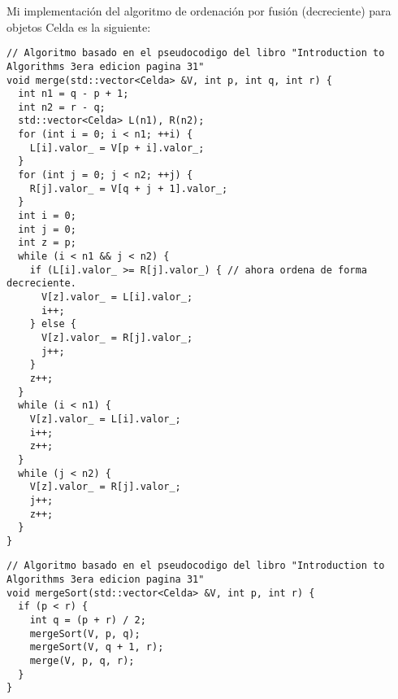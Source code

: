Mi implementación del algoritmo de ordenación por fusión (decreciente) para objetos Celda es la siguiente:
\begin{lstlisting}
// Algoritmo basado en el pseudocodigo del libro "Introduction to Algorithms 3era edicion pagina 31"
void merge(std::vector<Celda> &V, int p, int q, int r) {
  int n1 = q - p + 1;
  int n2 = r - q;
  std::vector<Celda> L(n1), R(n2);
  for (int i = 0; i < n1; ++i) {
    L[i].valor_ = V[p + i].valor_;
  }
  for (int j = 0; j < n2; ++j) {
    R[j].valor_ = V[q + j + 1].valor_;
  }
  int i = 0;
  int j = 0;
  int z = p;
  while (i < n1 && j < n2) {
    if (L[i].valor_ >= R[j].valor_) { // ahora ordena de forma decreciente.
      V[z].valor_ = L[i].valor_;
      i++;
    } else {
      V[z].valor_ = R[j].valor_;
      j++;
    }
    z++;
  }
  while (i < n1) {
    V[z].valor_ = L[i].valor_;
    i++;
    z++;
  }
  while (j < n2) {
    V[z].valor_ = R[j].valor_;
    j++;
    z++;
  }
}
\end{lstlisting}

\begin{lstlisting}
// Algoritmo basado en el pseudocodigo del libro "Introduction to Algorithms 3era edicion pagina 31"
void mergeSort(std::vector<Celda> &V, int p, int r) {
  if (p < r) {
    int q = (p + r) / 2;
    mergeSort(V, p, q);
    mergeSort(V, q + 1, r);
    merge(V, p, q, r);
  }
}
\end{lstlisting}